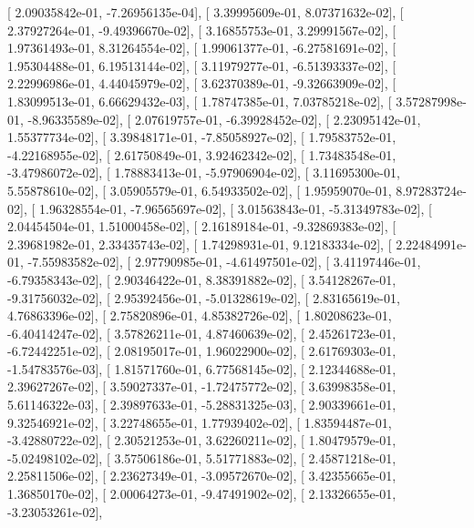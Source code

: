 \documentclass{article}
\begin{document}
       [  2.09035842e-01,  -7.26956135e-04],
       [  3.39995609e-01,   8.07371632e-02],
       [  2.37927264e-01,  -9.49396670e-02],
       [  3.16855753e-01,   3.29991567e-02],
       [  1.97361493e-01,   8.31264554e-02],
       [  1.99061377e-01,  -6.27581691e-02],
       [  1.95304488e-01,   6.19513144e-02],
       [  3.11979277e-01,  -6.51393337e-02],
       [  2.22996986e-01,   4.44045979e-02],
       [  3.62370389e-01,  -9.32663909e-02],
       [  1.83099513e-01,   6.66629432e-03],
       [  1.78747385e-01,   7.03785218e-02],
       [  3.57287998e-01,  -8.96335589e-02],
       [  2.07619757e-01,  -6.39928452e-02],
       [  2.23095142e-01,   1.55377734e-02],
       [  3.39848171e-01,  -7.85058927e-02],
       [  1.79583752e-01,  -4.22168955e-02],
       [  2.61750849e-01,   3.92462342e-02],
       [  1.73483548e-01,  -3.47986072e-02],
       [  1.78883413e-01,  -5.97906904e-02],
       [  3.11695300e-01,   5.55878610e-02],
       [  3.05905579e-01,   6.54933502e-02],
       [  1.95959070e-01,   8.97283724e-02],
       [  1.96328554e-01,  -7.96565697e-02],
       [  3.01563843e-01,  -5.31349783e-02],
       [  2.04454504e-01,   1.51000458e-02],
       [  2.16189184e-01,  -9.32869383e-02],
       [  2.39681982e-01,   2.33435743e-02],
       [  1.74298931e-01,   9.12183334e-02],
       [  2.22484991e-01,  -7.55983582e-02],
       [  2.97790985e-01,  -4.61497501e-02],
       [  3.41197446e-01,  -6.79358343e-02],
       [  2.90346422e-01,   8.38391882e-02],
       [  3.54128267e-01,  -9.31756032e-02],
       [  2.95392456e-01,  -5.01328619e-02],
       [  2.83165619e-01,   4.76863396e-02],
       [  2.75820896e-01,   4.85382726e-02],
       [  1.80208623e-01,  -6.40414247e-02],
       [  3.57826211e-01,   4.87460639e-02],
       [  2.45261723e-01,  -6.72442251e-02],
       [  2.08195017e-01,   1.96022900e-02],
       [  2.61769303e-01,  -1.54783576e-03],
       [  1.81571760e-01,   6.77568145e-02],
       [  2.12344688e-01,   2.39627267e-02],
       [  3.59027337e-01,  -1.72475772e-02],
       [  3.63998358e-01,   5.61146322e-03],
       [  2.39897633e-01,  -5.28831325e-03],
       [  2.90339661e-01,   9.32546921e-02],
       [  3.22748655e-01,   1.77939402e-02],
       [  1.83594487e-01,  -3.42880722e-02],
       [  2.30521253e-01,   3.62260211e-02],
       [  1.80479579e-01,  -5.02498102e-02],
       [  3.57506186e-01,   5.51771883e-02],
       [  2.45871218e-01,   2.25811506e-02],
       [  2.23627349e-01,  -3.09572670e-02],
       [  3.42355665e-01,   1.36850170e-02],
       [  2.00064273e-01,  -9.47491902e-02],
       [  2.13326655e-01,  -3.23053261e-02],
\end{document}
